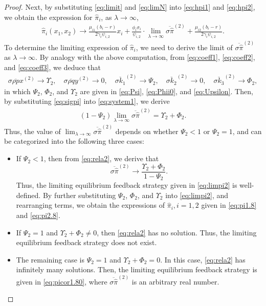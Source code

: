 \documentclass[11pt]{article}
\newcommand \la {\lambda}
\numberwithin{equation}{section}
\begin{document}
\begin{proof}
Next, by substituting \eqref{eq:limit} and \eqref{eq:limN} into \eqref{eq:hpi1} and \eqref{eq:hpi2}, we obtain the expression for
\(\widehat{\pi}_i\), as \(\lambda\to\infty\),
\begin{align}\label{eq:limpi2}
\widehat{\pi}_i(x_1, x_2) \to \frac{\mu_{i1}(b_i-r)}{2\gamma_i\psi_{i,2} }x_i+\frac{\phi_i\sigma_i}{\psi_{i,2}} \cdot
\lim_{\la \to \infty} \overline{\sigma \widehat{\pi}}^{(2)} + \frac{\mu_{i2}(b_i-r)}{2\gamma_i\psi_{i,2}}.
 \end{align}
To determine the limiting expression of \(\widehat{\pi}_i\), we need to derive the limit of \(\overline{\sigma\widehat{\pi}}^{(2)}\) as $\la \to \infty$. By analogy with the above computation, from \eqref{eq:coeff1}, \eqref{eq:coeff2}, and \eqref{eq:coeff3}, we deduce that
 \begin{align}\label{eq:sigpi}
 \overline{\sigma \rho px}^{(2)} \to \Upsilon_2,  \quad \overline{\sigma\rho qy}^{(2)} \to 0,
 \quad \overline{\sigma k_1}^{(2)} \to \Psi_2,   \quad \overline{\sigma k_2}^{(2)} \to 0,
  \quad \overline{\sigma k_3}^{(2)} \to \Phi_2,
 \end{align}
in which \(\Psi_2\), \(\Phi_2\), and \(\Upsilon_2\) are given in \eqref{eq:Psi}, \eqref{eq:Phii0}, and \eqref{eq:Upsilon}.
Then, by substituting \eqref{eq:sigpi} into \eqref{eq:system1}, we derive
	\begin{align}\label{eq:rela2}
		\left(1-\Psi_2\right) \lim_{\la \to \infty} \overline{\sigma \widehat{\pi}}^{(2)}=\Upsilon_2+\Phi_2.
	\end{align}
Thus, the value of $\lim_{\la \to \infty} \overline{\sigma \widehat{\pi}}^{(2)}$ depends on whether \(\Psi_2 < 1\) or \(\Psi_2=1\), and can be categorized into the following three cases:
\begin{itemize}
\item[$(1)$] If \(\Psi_2 < 1\), then from \eqref{eq:rela2}, we derive that
 \[\overline{\sigma\widehat{\pi}}^{(2)} \to \frac{\Upsilon_2+\Phi_2}{1 -\Psi_2}.\]
 Thus, the limiting equilibrium feedback strategy given in \eqref{eq:limpi2} is well-defined. By further substituting \(\Psi_2\), \(\Phi_2\), and \(\Upsilon_2\) into \eqref{eq:limpi2}, and rearranging terms, we obtain the expressions of $\widehat{\pi}_i, i=1,2$ given in \eqref{eq:pi1.8} and \eqref{eq:pi2.8}. 	
\item[$(2)$]  If \(\Psi_2=1\) and \(\Upsilon_2+\Phi_2\neq0\), then \eqref{eq:rela2} has no solution. Thus, the limiting equilibrium feedback strategy does not exist.
\item[$(3)$] The remaining case is \(\Psi_2 = 1\) and \(\Upsilon_2+\Phi_2=0\). In this case, \eqref{eq:rela2} has infinitely many solutions. Then, the limiting equilibrium feedback strategy is given in \eqref{eq:picor1.80}, where \(\overline{\sigma\widehat{\pi}}^{(2)}\) is an arbitrary real number.
 \end{itemize}
\end{proof}
\end{document}
